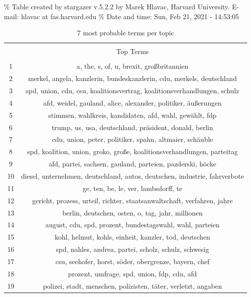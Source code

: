 \documentclass[
]{article}
\begin{document}
\% Table created by stargazer v.5.2.2 by Marek Hlavac, Harvard
University. E-mail: hlavac at fas.harvard.edu \% Date and time: Sun, Feb
21, 2021 - 14:53:05

\begin{table}[!htbp] \centering 
  \caption{7 most probable terms per topic} 
  \label{table:top_terms} 
\begin{tabular}{@{\extracolsep{5pt}} cc} 
\\[-1.8ex]\hline 
\hline \\[-1.8ex] 
 & Top Terms \\ 
\hline \\[-1.8ex] 
1 & a, the, s, of, u, brexit, großbritannien \\ 
2 & merkel, angela, kanzlerin, bundeskanzlerin, cdu, merkels, deutschland \\ 
3 & spd, union, cdu, csu, koalitionsvertrag, koalitionsverhandlungen, schulz \\ 
4 & afd, weidel, gauland, alice, alexander, politiker, äußerungen \\ 
5 & stimmen, wahlkreis, kandidaten, afd, wahl, gewählt, fdp \\ 
6 & trump, us, usa, deutschland, präsident, donald, berlin \\ 
7 & cdu, union, peter, politiker, spahn, altmaier, schäuble \\ 
8 & spd, koalition, union, groko, große, koalitionsverhandlungen, parteitag \\ 
9 & afd, partei, sachsen, gauland, parteien, pazderski, höcke \\ 
10 & diesel, unternehmen, deutschland, autos, deutschen, industrie, fahrverbote \\ 
11 & ge, ten, be, le, ver, lambsdorff, te \\ 
12 & gericht, prozess, urteil, richter, staatsanwaltschaft, verfahren, jahre \\ 
13 & berlin, deutschen, osten, o, tag, jahr, millionen \\ 
14 & august, cdu, spd, prozent, bundestagswahl, wahl, parteien \\ 
15 & kohl, helmut, kohls, einheit, kanzler, tod, deutschen \\ 
16 & spd, nahles, andrea, partei, scholz, schulz, schwesig \\ 
17 & csu, seehofer, horst, söder, obergrenze, bayern, chef \\ 
18 & prozent, umfrage, spd, union, fdp, cdu, afd \\ 
19 & polizei, stadt, menschen, polizisten, täter, verletzt, angaben \\ 

\end{tabular}
\end{table}
\end{document}
